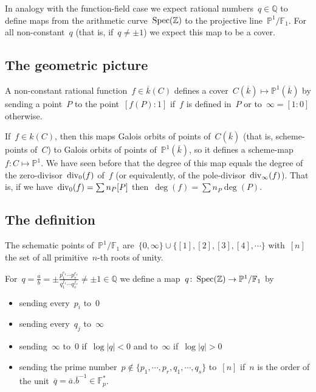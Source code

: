 \label{section:rational-numbers}
In analogy with the function-field case we expect rational numbers~$q \in \mathbb{Q}$ to define maps from the arithmetic curve~$\operatorname{Spec}(\mathbb{Z})$ to the projective line~$\mathbb{P}^1 / \mathbb{F}_1$. For all non-constant~$q$ (that is, if~$q \not= \pm 1$) we expect this map to be a cover.

\subsection{The geometric picture}

A non-constant rational function~$f \in \overline{k}(C)$ defines a cover~$C(\overline{k}) \mapsto \mathbb{P}^1(\overline{k})$ by sending a point~$P$ to the point~$[f(P):1]$ if~$f$ is defined in~$P$ or to~$\infty = [1 : 0]$ otherwise.

If~$f \in k(C)$, then this maps Galois orbits of points of~$C(\overline{k})$ (that is, scheme-points of~$C$) to Galois orbits of points of~$\mathbb{P}^1(\overline{k})$, so it defines a scheme-map~$f\colon C \mapsto \mathbb{P}^1$. We have seen before that the degree of this map equals the degree of the zero-divisor~$\operatorname{div}_0(f)$ of~$f$ (or equivalently, of the pole-divisor~$\operatorname{div}_{\infty}(f)$). That is, if we have~$\operatorname{div}_0(f) = \sum n_P [P]$ then~$\deg(f)=\sum n_P \deg(P)$.

\subsection{The definition}

The schematic points of~$\mathbb{P}^1 / \mathbb{F}_1$ are~$\{ 0,\infty \} \cup \{ [1],[2],[3],[4],\cdots \}$ with~$[n]$ the set of all primitive~$n$-th roots of unity.

For~$q = \frac{a}{b} = \pm \frac{p_1^{e_1} \cdots p_r^{e_r}}{q_1^{f_1} \cdots q_s^{f_s}} \not= \pm 1 \in \mathbb{Q}$ we define a map~$q\colon\operatorname{Spec}(\mathbb{Z}) \rightarrow \mathbb{P}^1 / \mathbb{F}_1$ by
\begin{itemize}
  \item sending every~$p_i$ to~$0$ 
  \item sending every~$q_j$ to~$\infty$
  \item sending~$\infty$ to~$0$ if~$\log |q| < 0$ and to~$\infty$ if~$\log |q| > 0$
  \item sending the prime number~$p \notin \{ p_1,\cdots,p_r,q_1,\cdots,q_s \}$ to~$[n]$ if~$n$ is the order of the unit~$\overline{q} = \overline{a}.\overline{b}^{-1} \in \mathbb{F}_p^*$.
\end{itemize}

